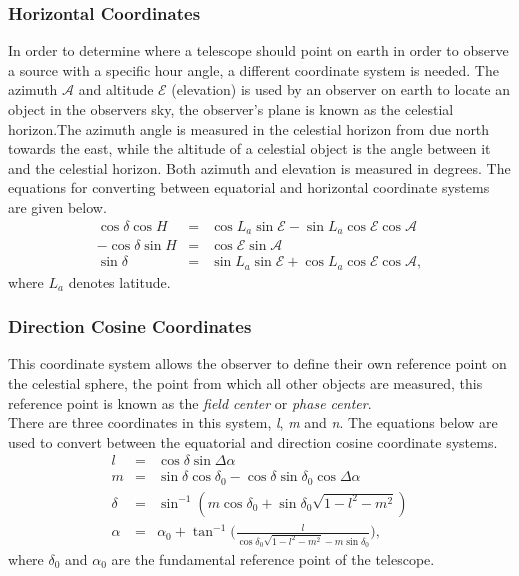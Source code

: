 \subsubsection{Horizontal Coordinates}
In order to determine where a telescope should point on earth in order to observe a source with a specific hour angle, a different coordinate system is needed. The azimuth $\mathcal{A}$ and altitude $\mathcal{E}$ (elevation) is used by an observer on earth to locate an object in the observers sky, the observer's plane is known as the celestial horizon.The azimuth angle is measured in the celestial horizon from due north towards the east, while the altitude of a celestial object is the angle between it and the celestial horizon. Both azimuth and elevation is measured in degrees. The equations for converting between equatorial and horizontal coordinate systems are given below. 
\begin{eqnarray*}
\cos\delta\cos H &=& \cos L_a\sin \mathcal{E} - \sin L_a\cos \mathcal{E}\cos \mathcal{A}\\
-\cos\delta\sin H&=& \cos \mathcal{E}\sin \mathcal{A}\\
\sin\delta &=& \sin L_a\sin \mathcal{E}+\cos L_a \cos \mathcal{E} \cos \mathcal{A},
\end{eqnarray*}
where $L_a$ denotes latitude.
\subsubsection{Direction Cosine Coordinates}
This coordinate system allows the observer to define their own reference point on the celestial sphere, the point from which all other objects are measured, this reference point is known as the \textit{field center} or \textit{phase center}. \\
There are three coordinates in this system, \textit{l}, \textit{m} and \textit{n}. The equations below are used to convert between the equatorial and direction cosine coordinate systems. 
\begin{eqnarray}
l &=&  \cos \delta  \sin \Delta \alpha \nonumber\\
m &=& \sin \delta \cos \delta_0 - \cos \delta \sin \delta_0 \cos\Delta \alpha \nonumber\\
\delta &=& \sin^{-1}(m\cos \delta_0 + \sin \delta_0\sqrt{1-l^2-m^2})\nonumber\\
\alpha &=& \alpha_0 + \tan^{-1}\bigg(\frac{l}{\cos\delta_0\sqrt{1-l^2-m^2}-m\sin\delta_0}\bigg)\nonumber, 
\end{eqnarray}
where $\delta_0$ and $\alpha_0$ are the fundamental reference point of the telescope.
